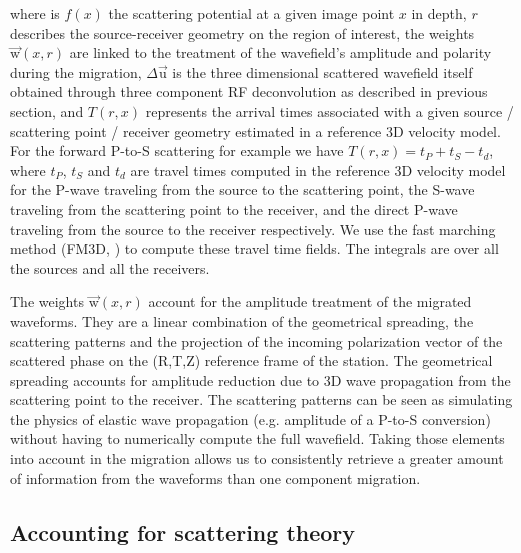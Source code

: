\documentclass[10pt,a4paper]{article}
\numberwithin{equation}{section}
\DeclareRobustCommand{\rq}[1]{{\sethlcolor{myblue}\hl{#1}}}
\begin{document}
\noindent where is $f(x)$ the scattering potential at a given image point $x$ in depth, 
$r$ describes the source-receiver geometry on the region of interest, 
the weights $\vec{\text{w}}(x,r)$ are linked to the treatment of the wavefield’s amplitude and polarity during the migration, 
$\Delta\vec{\text{u}}$ is the three dimensional scattered wavefield itself obtained through three component RF deconvolution as described in previous section, 
and $T(r,x)$ represents the arrival times associated with a given source / scattering point / receiver geometry estimated in a reference 3D velocity model.
For the forward P-to-S scattering for example we have $T(r,x) = t_P + t_S - t_d$, where $t_P$, $t_S$ and $t_d$ are travel times computed in the reference 3D velocity model for the P-wave traveling from the source to the scattering point, the S-wave traveling from the scattering point to the receiver, and the direct P-wave traveling  from the source to the receiver respectively.
We use the fast marching method (FM3D, \cite{deko_gji_06}) to compute these travel time fields.
The integrals are over all the sources and all the receivers.

The weights $\vec{\text{w}}(x,r)$ account for the amplitude treatment of the migrated waveforms.
They are a linear combination of the geometrical spreading, the scattering patterns and the projection of the incoming polarization vector of the scattered phase on the (R,T,Z) reference frame of the station.
The geometrical spreading accounts for amplitude reduction due to 3D wave propagation from the scattering point to the receiver.
The scattering patterns can be seen as simulating the physics of elastic wave propagation (e.g. amplitude of a P-to-S conversion) without having to numerically compute the full wavefield.
Taking those elements into account in the migration allows us to consistently retrieve a greater amount of information from the waveforms than one component migration.

\subsection{Accounting for scattering theory}
\end{document}
